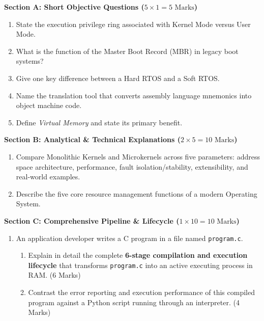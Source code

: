\begin{chaptertest}
\noindent\textbf{Section A: Short Objective Questions ($5 \times 1 = 5\text{ Marks}$)}
\begin{enumerate}[leftmargin=1.5em]
    \item State the execution privilege ring associated with Kernel Mode versus User Mode.
    \item What is the function of the Master Boot Record (MBR) in legacy boot systems?
    \item Give one key difference between a Hard RTOS and a Soft RTOS.
    \item Name the translation tool that converts assembly language mnemonics into object machine code.
    \item Define \textit{Virtual Memory} and state its primary benefit.
\end{enumerate}

\medskip
\noindent\textbf{Section B: Analytical \& Technical Explanations ($2 \times 5 = 10\text{ Marks}$)}
\begin{enumerate}[leftmargin=1.5em, start=6]
    \item Compare Monolithic Kernels and Microkernels across five parameters: address space architecture, performance, fault isolation/stability, extensibility, and real-world examples.
    \item Describe the five core resource management functions of a modern Operating System.
\end{enumerate}

\medskip
\noindent\textbf{Section C: Comprehensive Pipeline \& Lifecycle ($1 \times 10 = 10\text{ Marks}$)}
\begin{enumerate}[leftmargin=1.5em, start=8]
    \item An application developer writes a C program in a file named \texttt{program.c}.
    \begin{enumerate}[label=(\alph*)]
        \item Explain in detail the complete \textbf{6-stage compilation and execution lifecycle} that transforms \texttt{program.c} into an active executing process in RAM. (6 Marks)
        \item Contrast the error reporting and execution performance of this compiled program against a Python script running through an interpreter. (4 Marks)
    \end{enumerate}
\end{enumerate}
\end{chaptertest}

